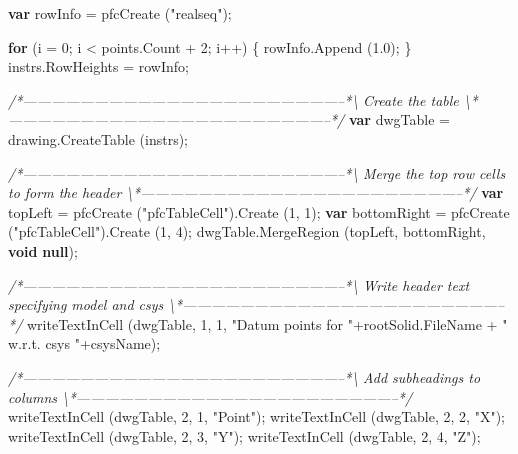 \documentclass[]{article}
\newenvironment{Shaded}{}{}
\newcommand{\KeywordTok}[1]{\textcolor[rgb]{0.00,0.44,0.13}{\textbf{{#1}}}}
\newcommand{\DecValTok}[1]{\textcolor[rgb]{0.25,0.63,0.44}{{#1}}}
\newcommand{\FloatTok}[1]{\textcolor[rgb]{0.25,0.63,0.44}{{#1}}}
\newcommand{\StringTok}[1]{\textcolor[rgb]{0.25,0.44,0.63}{{#1}}}
\newcommand{\CommentTok}[1]{\textcolor[rgb]{0.38,0.63,0.69}{\textit{{#1}}}}
\newcommand{\OtherTok}[1]{\textcolor[rgb]{0.00,0.44,0.13}{{#1}}}
\newcommand{\FunctionTok}[1]{\textcolor[rgb]{0.02,0.16,0.49}{{#1}}}
\newcommand{\NormalTok}[1]{{#1}}
\begin{document}
\begin{Shaded}
\begin{Highlighting}[]
  \KeywordTok{var} \NormalTok{rowInfo = }\FunctionTok{pfcCreate} \NormalTok{(}\StringTok{"realseq"}\NormalTok{);}
  
  \KeywordTok{for} \NormalTok{(i = }\DecValTok{0}\NormalTok{; i < }\OtherTok{points}\NormalTok{.}\FunctionTok{Count} \NormalTok{+ }\DecValTok{2}\NormalTok{; i++)}
    \NormalTok{\{}
      \OtherTok{rowInfo}\NormalTok{.}\FunctionTok{Append} \NormalTok{(}\FloatTok{1.0}\NormalTok{);}
    \NormalTok{\}}
  \OtherTok{instrs}\NormalTok{.}\FunctionTok{RowHeights} \NormalTok{= rowInfo;}

\CommentTok{/*--------------------------------------------------------------------*\textbackslash{}    }
\CommentTok{  Create the table}
\CommentTok{\textbackslash{}*--------------------------------------------------------------------*/}    
  \KeywordTok{var} \NormalTok{dwgTable = }\OtherTok{drawing}\NormalTok{.}\FunctionTok{CreateTable} \NormalTok{(instrs);}
  
\CommentTok{/*--------------------------------------------------------------------*\textbackslash{}    }
\CommentTok{  Merge the top row cells to form the header}
\CommentTok{\textbackslash{}*--------------------------------------------------------------------*/} 
  \KeywordTok{var} \NormalTok{topLeft = }\FunctionTok{pfcCreate} \NormalTok{(}\StringTok{"pfcTableCell"}\NormalTok{).}\FunctionTok{Create} \NormalTok{(}\DecValTok{1}\NormalTok{, }\DecValTok{1}\NormalTok{);}
  \KeywordTok{var} \NormalTok{bottomRight = }\FunctionTok{pfcCreate} \NormalTok{(}\StringTok{"pfcTableCell"}\NormalTok{).}\FunctionTok{Create} \NormalTok{(}\DecValTok{1}\NormalTok{, }\DecValTok{4}\NormalTok{);}
  \OtherTok{dwgTable}\NormalTok{.}\FunctionTok{MergeRegion} \NormalTok{(topLeft, bottomRight, }\KeywordTok{void} \KeywordTok{null}\NormalTok{);}

\CommentTok{/*--------------------------------------------------------------------*\textbackslash{}    }
\CommentTok{  Write header text specifying model and csys}
\CommentTok{\textbackslash{}*--------------------------------------------------------------------*/}
  \FunctionTok{writeTextInCell} \NormalTok{(dwgTable, }\DecValTok{1}\NormalTok{, }\DecValTok{1}\NormalTok{, }
           \StringTok{"Datum points for "}\NormalTok{+}\OtherTok{rootSolid}\NormalTok{.}\FunctionTok{FileName} \NormalTok{+ }\StringTok{" w.r.t. csys "}\NormalTok{+csysName);    }

\CommentTok{/*--------------------------------------------------------------------*\textbackslash{}    }
\CommentTok{  Add subheadings to columns}
\CommentTok{\textbackslash{}*--------------------------------------------------------------------*/}
  \FunctionTok{writeTextInCell} \NormalTok{(dwgTable, }\DecValTok{2}\NormalTok{, }\DecValTok{1}\NormalTok{, }\StringTok{"Point"}\NormalTok{);}
  \FunctionTok{writeTextInCell} \NormalTok{(dwgTable, }\DecValTok{2}\NormalTok{, }\DecValTok{2}\NormalTok{, }\StringTok{"X"}\NormalTok{);}
  \FunctionTok{writeTextInCell} \NormalTok{(dwgTable, }\DecValTok{2}\NormalTok{, }\DecValTok{3}\NormalTok{, }\StringTok{"Y"}\NormalTok{);}
  \FunctionTok{writeTextInCell} \NormalTok{(dwgTable, }\DecValTok{2}\NormalTok{, }\DecValTok{4}\NormalTok{, }\StringTok{"Z"}\NormalTok{);}


\end{Highlighting}
\end{Shaded}
\end{document}
